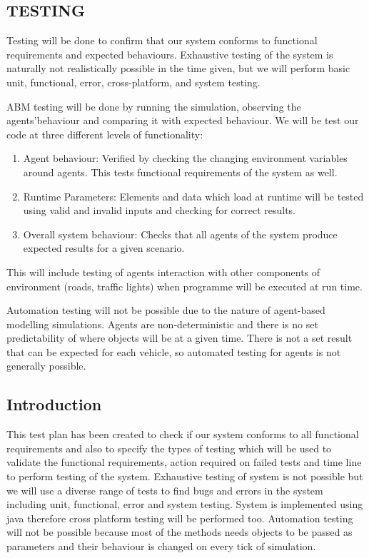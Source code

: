 \documentclass[11pt]{article}
\begin{document}
\begin{enumerate}
\section{TESTING}


Testing will be done to confirm that our system conforms to functional requirements and expected behaviours. Exhaustive testing of the system is naturally not realistically possible in the time given, but we will perform basic unit, functional, error, cross-platform, and system testing. 

ABM testing will be done by running the simulation, observing the agents\textquoteright  behaviour and comparing it with expected behaviour. We will be test our code at three diﬀerent levels of functionality:

\begin{enumerate}\itemsep0pt
\item Agent behaviour: Verified by checking the changing environment variables around agents. This tests functional requirements of the system as well.
\item Runtime Parameters: Elements and data which load at runtime will be tested using valid and invalid inputs and checking for correct results. 
\item Overall system behaviour: Checks that all agents of the system produce expected results for a given scenario.
\end{enumerate}

This will include testing of agents interaction with other components of environment (roads, traﬃc lights) when programme will be executed at run time.

Automation testing will not be possible due to the nature of agent-based modelling simulations. Agents are non-deterministic and there is no set predictability of where objects will be at a given time. There is not a set result that can be expected for each vehicle, so automated testing for agents is not generally possible. 
\subsection{Introduction}
This test plan has been created to check if our system conforms to all functional requirements and also to specify the types of testing which will be used to validate the functional requirements, action required on failed tests and time line to perform testing of the system. Exhaustive testing of system is not possible but we will use a diverse range of tests to find bugs and errors in the system including unit, functional, error and system testing. System is implemented using java therefore cross platform testing will be performed too. Automation testing will not be possible because most of the methods needs objects to be passed as parameters and their behaviour is changed on every tick of simulation. 


\end{enumerate}
\end{document}
